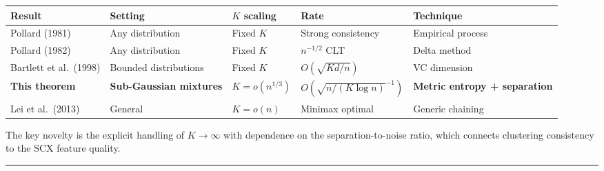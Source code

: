 \documentclass[
  12pt,
]{article}
\begin{document}
\begin{longtable}[]{@{}
  >{\raggedright\arraybackslash}p{}
  >{\raggedright\arraybackslash}p{}
  >{\raggedright\arraybackslash}p{}
  >{\raggedright\arraybackslash}p{}
  >{\raggedright\arraybackslash}p{}@{}}
\toprule\noalign{}
\begin{minipage}[b]{\linewidth}\raggedright
Result
\end{minipage} & \begin{minipage}[b]{\linewidth}\raggedright
Setting
\end{minipage} & \begin{minipage}[b]{\linewidth}\raggedright
\(K\) scaling
\end{minipage} & \begin{minipage}[b]{\linewidth}\raggedright
Rate
\end{minipage} & \begin{minipage}[b]{\linewidth}\raggedright
Technique
\end{minipage} \\
\midrule\noalign{}
\endhead
\bottomrule\noalign{}
\endlastfoot
Pollard (1981) & Any distribution & Fixed \(K\) & Strong consistency &
Empirical process \\
Pollard (1982) & Any distribution & Fixed \(K\) & \(n^{-1/2}\) CLT &
Delta method \\
Bartlett et al.~(1998) & Bounded distributions & Fixed \(K\) &
\(O(\sqrt{K d / n})\) & VC dimension \\
\textbf{This theorem} & \textbf{Sub-Gaussian mixtures} &
\textbf{\(K = o(n^{1/3})\)} & \textbf{\(O(\sqrt{n/(K\log n)}^{-1})\)} &
\textbf{Metric entropy + separation} \\
Lei et al.~(2013) & General & \(K = o(n)\) & Minimax optimal & Generic
chaining \\
\end{longtable}

The key novelty is the explicit handling of \(K \to \infty\) with
dependence on the separation-to-noise ratio, which connects clustering
consistency to the SCX feature quality.

\begin{center}\rule{0.5\linewidth}{0.5pt}\end{center}
\end{document}
